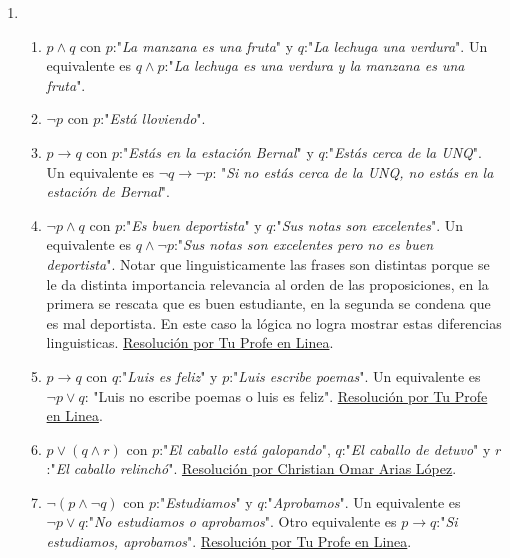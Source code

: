 \documentclass[a4paper]{article}
\newcommand{\exercise}{\item}
\newcommand{\then}{\to}
\begin{document}
\begin{enumerate}
\begin{enumerate} [label=(\alph*)]
		\item Función afirmativa, es una proposición. Para averiguar su valor de verdad debemos buscar las raíces de la parábola, es decir, $x^2-4=0$. Mediante la fórmula de Bhaskara (la resolvente cuadrática) podemos obtener que $x=2$ o $x=-2$. $2$ y $-2$ son números reales. Por lo que la proposición es falsa.
\end{enumerate}\exercise\begin{enumerate} [label=(\alph*)]		\item $p \land q$ con $p$:"\textit{La manzana es una fruta}" y $q$:"\textit{La lechuga una verdura}". Un equivalente es $q \land p$:"\textit{La lechuga es una verdura y la manzana es una fruta}".
		\item $\neg p$ con $p$:"\textit{Está lloviendo}".
		\item $p\then q$ con $p$:"\textit{Estás en la estación Bernal}" y $q$:"\textit{Estás cerca de la UNQ}". Un equivalente es $\neg q \then \neg p$: "\textit{Si no estás cerca de la UNQ, no estás en la estación de Bernal}".
		\item $\neg p \land q$ con $p$:"\textit{Es buen deportista}" y $q$:"\textit{Sus notas son excelentes}". Un equivalente es $q \land \neg p$:"\textit{Sus notas son excelentes pero no es buen deportista}". Notar que linguisticamente las frases son distintas porque se le da distinta importancia relevancia al orden de las proposiciones, en la primera se rescata que es buen estudiante, en la segunda se condena que es mal deportista. En este caso la lógica no logra mostrar estas diferencias linguisticas. \href{https://youtu.be/HXzyX5XGPp8?t=503}{Resolución por Tu Profe en Linea}.
		\item $p \then q$ con $q$:"\textit{Luis es feliz}" y $p$:"\textit{Luis escribe poemas}". Un equivalente es $\neg p \lor q$: "Luis no escribe poemas o luis es feliz". \href{https://youtu.be/HXzyX5XGPp8?t=374}{Resolución por Tu Profe en Linea}.
		\item $p \lor (q \land r)$ con $p$:"\textit{El caballo está galopando}", $q$:"\textit{El caballo de detuvo}" y $r$:"\textit{El caballo relinchó}". \href{https://youtu.be/TgwraosKUuY?t=70}{Resolución por Christian Omar Arias López}.
		\item $\neg (p \land \neg q)$ con $p$:"\textit{Estudiamos}" y $q$:"\textit{Aprobamos}". Un equivalente es $\neg p \lor q$:"\textit{No estudiamos o aprobamos}". Otro equivalente es $p \then q$:"\textit{Si estudiamos, aprobamos}". \href{https://youtu.be/HXzyX5XGPp8}{Resolución por Tu Profe en Linea}.

\end{enumerate}
\end{enumerate}
\end{document}
